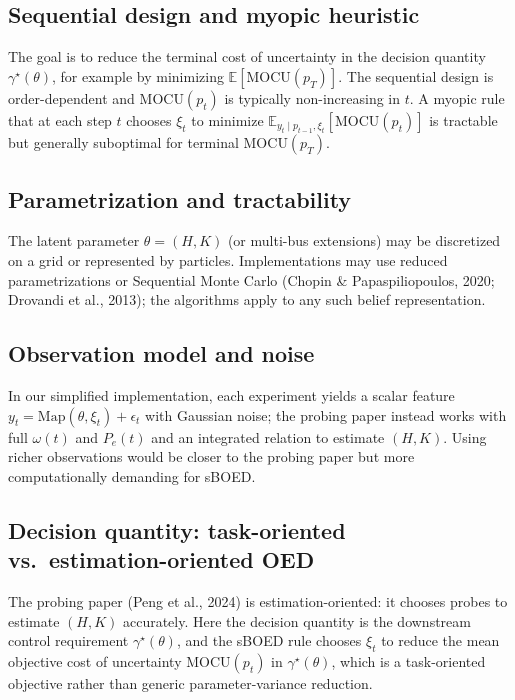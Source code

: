 \documentclass[10pt]{article}
\newcommand{\Map}{\mathrm{Map}}
\newcommand{\MOCU}{\mathrm{MOCU}}
\begin{document}
\subsection{Sequential design and myopic heuristic}

The goal is to reduce the terminal cost of uncertainty in the decision quantity $\gamma^\star(\theta)$, for example by minimizing $\mathbb{E}[\MOCU(p_T)]$. The sequential design is order-dependent and $\MOCU(p_t)$ is typically non-increasing in $t$. A myopic rule that at each step $t$ chooses $\xi_t$ to minimize $\mathbb{E}_{y_t\mid p_{t-1},\xi_t}[\MOCU(p_t)]$ is tractable but generally suboptimal for terminal $\MOCU(p_T)$.

\subsection{Parametrization and tractability}

The latent parameter $\theta=(H,K)$ (or multi-bus extensions) may be discretized on a grid or represented by particles. Implementations may use reduced parametrizations or Sequential Monte Carlo (Chopin \& Papaspiliopoulos, 2020; Drovandi et al., 2013); the algorithms apply to any such belief representation.

\subsection{Observation model and noise}

In our simplified implementation, each experiment yields a scalar feature $y_t=\Map(\theta,\xi_t)+\epsilon_t$ with Gaussian noise; the probing paper instead works with full $\omega(t)$ and $P_e(t)$ and an integrated relation to estimate $(H,K)$. Using richer observations would be closer to the probing paper but more computationally demanding for sBOED.

\subsection{Decision quantity: task-oriented vs.\ estimation-oriented OED}

The probing paper (Peng et al., 2024) is estimation-oriented: it chooses probes to estimate $(H,K)$ accurately. Here the decision quantity is the downstream control requirement $\gamma^\star(\theta)$, and the sBOED rule chooses $\xi_t$ to reduce the mean objective cost of uncertainty $\MOCU(p_t)$ in $\gamma^\star(\theta)$, which is a task-oriented objective rather than generic parameter-variance reduction.
\end{document}
